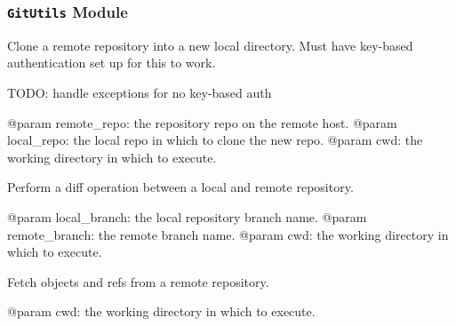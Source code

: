 \documentclass[a4paper,11pt,openany]{sphinxmanual}
\begin{document}
\subsubsection{\texttt{GitUtils} Module}
\label{ref-manual/XrdTest:module-XrdTest.GitUtils}\label{ref-manual/XrdTest:gitutils-module}

\begin{fulllineitems}
\label{ref-manual/XrdTest:XrdTest.GitUtils.git_clone}
Clone a remote repository into a new local directory. Must have key-based
authentication set up for this to work.

TODO: handle exceptions for no key-based auth

@param remote\_repo: the repository repo on the remote host. 
@param local\_repo: the local repo in which to clone the new repo.
@param cwd: the working directory in which to execute.

\end{fulllineitems}


\begin{fulllineitems}
\label{ref-manual/XrdTest:XrdTest.GitUtils.git_diff}
Perform a diff operation between a local and remote repository.

@param local\_branch: the local repository branch name.
@param remote\_branch: the remote branch name.
@param cwd: the working directory in which to execute.

\end{fulllineitems}


\begin{fulllineitems}
\label{ref-manual/XrdTest:XrdTest.GitUtils.git_fetch}
Fetch objects and refs from a remote repository.

@param cwd: the working directory in which to execute.

\end{fulllineitems}

\end{document}
